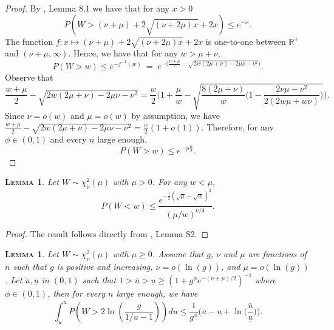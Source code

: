 \documentclass[bj,authoryear]{imsart}
\theoremstyle{plain}
\newtheorem{lem}[thm]{\textsc{Lemma}}
\newcommand{\R}{\mathbb{R}}
\begin{document}
\begin{proof}
By \cite{birge}, Lemma 8.1 we have that for any $x>0$
$$P(W> (\nu+\mu)+2 \sqrt{(\nu+2 \mu) x}+2 x) \leq e^{-x}.$$
The function $f:x\mapsto (\nu+\mu)+2 \sqrt{(\nu+2 \mu) x}+2 x$ is  one-to-one between $\R^+$ and $( \nu+
\mu,\infty)$. 
Hence, we have that for any $w>\mu+\nu$,
$$P(W > w) \leq e^{-f^{-1}(w)} \:=\; e^{-\big(\frac{w+\mu}{2}  - \sqrt{2w(2 \mu+\nu)-2 \mu \nu - \nu^2 }\big) } .$$
Observe that
$$\frac{w+\mu}{2}  - \sqrt{2w( 2 \mu+ \nu)-2 \mu \nu - \nu^2 }= \frac{w}{2}\bigg(1+\frac{\mu}{w} -\sqrt{\frac{8(2 \mu+\nu)}{w}\bigg(1-\frac{2\nu\mu-\nu^2}{2(2w\mu+w\nu)} \bigg)}\bigg).$$
 Since $\nu=o(w)$ and $\mu=o(w)$ by assumption, we have $\frac{w+\mu}{2}  - \sqrt{2w( 2 \mu+ \nu)-2 \mu \nu - \nu^2 }= \frac{w}{2}(1+o(1))$. Therefore, for any $\phi\in(0,1)$ and every $n$ large enough.
$$P(W > w) \leq  e^{-\phi\frac{w}{2}}.$$
\end{proof}


\begin{lem}\label{lemma:s2} Let $W \sim \chi_\nu^2(\mu)$ with $\mu>0$. For any $w<\mu$, 
$$
P(W<w) \leq \frac{e^{-\frac{1}{2}(\sqrt{\mu}-\sqrt{w})^2}}{(\mu / w)^{\nu / 4}}.$$
\end{lem}

\begin{proof}
The result follows directly from \cite{rossell2022concentration}, Lemma S2.
\end{proof}

\begin{lem}\label{lemma:s18} 
    Let $W\sim \chi_\nu^2(\mu)$ with $\mu \geq 0$. Assume that $g$, $\nu$ and $\mu$ are functions of $n$ such that $g$ is positive and increasing,  $\nu=o(\ln(g))$, and $\mu=o(\ln(g))$. Let $\bar{u},\underline{u}$ in $(0,1)$ such that $1>\bar{u}>\underline{u}\geq\left(1+g^{\phi}e^{-(\nu+\mu)/2}\right)^{-1}$ where $\phi\in(0,1)$, then for every $n$ large enough, we have 
$$
\int_{\underline{u}}^{\bar{u}} P\left(W>2\ln \left(\frac{g}{1 / u-1}\right)\right) d u \leq  \frac{1}{g^{\phi}}\Big(\bar{u}-\underline{u}+\ln\Big(\frac{\bar{u}}{\underline{u}}\Big)\Big).
$$
\end{lem}
\end{document}
